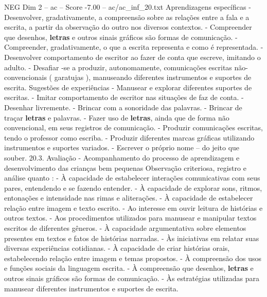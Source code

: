 \begin{textsample}{NEG Dim 2 – ac – Score -7.00 – ac/ac\_inf\_20.txt}
Aprendizagens específicas - Desenvolver, gradativamente, a compreensão sobre as relações entre a fala e a escrita, a partir da observação do outro nos diversos contextos. - Compreender que desenhos, \textbf{letras} e outros sinais gráficos são formas de comunicação. - Compreender, gradativamente, o que a escrita representa e como é representada. - Desenvolver comportamento de escritor ao fazer de conta que escreve, imitando o adulto. - Desafiar -se a produzir, autonomamente, comunicações escritas não-convencionais ( garatujas ), manuseando diferentes instrumentos e suportes de escrita.
Sugestões de experiências - Manusear e explorar diferentes suportes de escritas. - Imitar comportamento de escritor nas situações de faz de conta. - Desenhar livremente. - Brincar com a sonoridade das palavras. - Brincar de traçar \textbf{letras} e palavras. - Fazer uso de \textbf{letras}, ainda que de forma não convencional, em seus registros de comunicação. - Produzir comunicações escritas, tendo o professor como escriba. - Produzir diferentes marcas gráficas utilizando instrumentos e suportes variados. - Escrever o próprio nome – do jeito que souber. 20.3.
Avaliação - Acompanhamento do processo de aprendizagem e desenvolvimento das crianças bem pequenas Observação criteriosa, registro e análise quanto : - À capacidade de estabelecer interações comunicativas com seus pares, entendendo e se fazendo entender. - À capacidade de explorar sons, ritmos, entonações e intensidade nas rimas e aliterações. - À capacidade de estabelecer relação entre imagem e texto escrito. - Ao interesse em ouvir leitura de histórias e outros textos. - Aos procedimentos utilizados para manusear e manipular textos escritos de diferentes gêneros. - À capacidade argumentativa sobre elementos presentes em textos e fatos de histórias narradas. - Às iniciativas em relatar suas diversas experiências cotidianas. - À capacidade de criar histórias orais, estabelecendo relação entre imagem e temas propostos. - À compreensão dos usos e funções sociais da linguagem escrita. - À compreensão que desenhos, \textbf{letras} e outros sinais gráficos são formas de comunicação. - Às estratégias utilizadas para manusear diferentes instrumentos e suportes de escrita.

\end{textsample}
